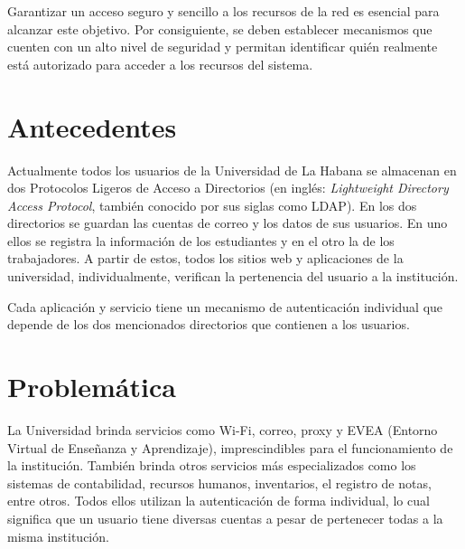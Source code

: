 
Garantizar un acceso seguro y sencillo a los recursos de la red es esencial para alcanzar este objetivo. Por consiguiente, se deben establecer mecanismos que cuenten con un alto nivel de seguridad y permitan identificar quién realmente está autorizado para acceder a los recursos del sistema.




\section*{Antecedentes}

Actualmente todos los usuarios de la Universidad de La Habana se almacenan en dos Protocolos Ligeros de Acceso a Directorios (en inglés: \textit{Lightweight Directory Access Protocol}, también conocido por sus siglas como LDAP). En los dos directorios se guardan las cuentas de correo y los datos de sus usuarios. En uno ellos se registra la información de los estudiantes y en el otro la de los trabajadores. A partir de estos, todos los sitios web y aplicaciones de la universidad, individualmente, verifican la pertenencia del usuario a la institución.

Cada aplicación y servicio tiene un mecanismo de autenticación individual que depende de los dos mencionados directorios que contienen a los usuarios.

\section*{Problemática}
La Universidad brinda servicios como Wi-Fi, correo, proxy y EVEA (Entorno Virtual de Enseñanza  y Aprendizaje), imprescindibles para el funcionamiento de la institución. También brinda otros servicios más especializados como los sistemas de contabilidad, recursos humanos, inventarios, el registro de notas, entre otros. Todos ellos utilizan la autenticación de forma individual, lo cual significa que un usuario tiene diversas cuentas a pesar de pertenecer todas a la misma institución.

